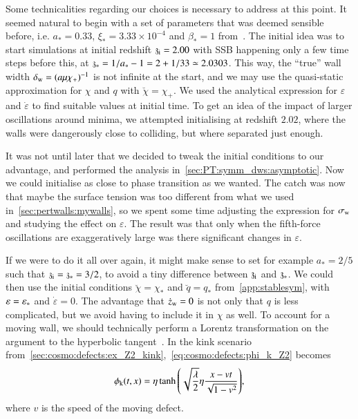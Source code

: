 


Some technicalities regarding our choices is necessary to address at this point.  %
It seemed natural to begin with a set of parameters that was deemed sensible before, i.e. $a_\ast = 0.33$, $\xi_\ast = 3.33\times 10^{-4}$ and $\beta_\ast = 1$ from~\citet{christiansenAsevolutionRelativisticNbody2023}. %
The initial idea was to start simulations at initial redshift $\mathfrak{z}_\mathrm{i}=2.00$ with SSB happening only a few time steps before this, at $\mathfrak{z}_\ast = 1/a_\ast - 1 = 2 + 1/33 \simeq 2.0303$. This way, the ``true'' wall width $\delta_\mathrm{w} = (a\mu\chi_+)^{-1}$ is not infinite at the start, and we may use the quasi-static approximation for $\chi$ and $q$ with $\breve{\chi}= \chi_+$. We used the analytical expression for $\varepsilon$ and $\dot{\varepsilon}$ to find suitable values at initial time. To get an idea of the impact of larger oscillations around minima, we attempted initialising at redshift $2.02$, where the walls were dangerously close to colliding, but where separated just enough. 



It was not until later that we decided to tweak the initial conditions to our advantage, and performed the analysis in~\cref{sec:PT:symm_dws:asymptotic}. Now we could initialise as close to phase transition as we wanted. The catch was now that maybe the surface tension was too different from what we used in~\cref{sec:pertwalls:mywalls}, so we spent some time adjusting the expression for $\sigma_\mathrm{w}$ and studying the effect on $\varepsilon$. The result was that only when the fifth-force oscillations are exaggeratively large was there significant changes in $\varepsilon$. 


If we were to do it all over again, it might make sense to set %
for example 
$a_\ast = 2/5$ such that $\mathfrak{z}_\mathrm{i}=\mathfrak{z}_\ast = 3/2$, 
to avoid a tiny difference between $\mathfrak{z}_\mathrm{i}$ and $\mathfrak{z}_\ast$. %
We could then use the initial conditions $\breve{\chi}=\chi_\ast$ and $\breve{q}=q_\ast$ from~\cref{app:stablesym}, with $\varepsilon=\varepsilon_\ast$ and $\dot{\varepsilon}=0$. %
The advantage that $\dot{z}_\mathrm{w}=0$ is not only that $q$ is less complicated, but we avoid having to include it in $\chi$ as well. To account for a moving wall, we should technically perform a Lorentz transformation on the argument to the hyperbolic tangent~\citep{vachaspatiKinksDomainWalls2006,blanco-pilladoDynamicsDomainWall2023}. In the kink scenario from~\cref{sec:cosmo:defects:ex_Z2_kink},~\cref{eq:cosmo:defects:phi_k_Z2} becomes~\citep{vachaspatiKinksDomainWalls2006}
\begin{equation}
    \phi_\mathrm{k}(t, x ) = \eta \tanh{{\left( \sqrt{\frac{\lambda}{2}}\eta  \frac{x - vt}{\sqrt{1-v^2}}  \right)}},
\end{equation}
where $v$ is the speed of the moving defect.

